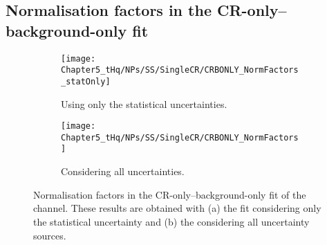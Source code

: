 \begin{comment}
\begin{figure}[h]
  \centering
  \texttt{[image: Chapter5\_tHq/NPs/SS/SingleCR/CRBONLY\_NuisPar\_VVPDF]}
   \caption{Constraints and pulls on the NPs of the diboson PDFs in the CR-only--background-only fit of the \dilepSStau channel.
   Each NP is shown as the relative change from its nominal value.
   The green and yellow areas represent the $\pm1\sigma$ and $\pm2\sigma$ deviations from the nominal value of the NP, respectively. 
   The points represent the best-fit value for the NP and the uncertainty bars represent the post-fit uncertainty.}
  \label{fig:Appendix:AdditionalResults:SS:CRBONLY:CRBONLY_NuisPar_VVPDF}
\end{figure}
\end{comment}


\FloatBarrier
\subsection{Normalisation factors  in the \dilepSStau CR-only--background-only fit}
\label{sec:Appendix:AdditionalResults:SS:CRBONLY:NormFactors}

\begin{figure}[h]
\centering
\begin{subfigure}{.5\textwidth}
  \centering
  \texttt{[image: Chapter5\_tHq/NPs/SS/SingleCR/CRBONLY\_NormFactors\_statOnly]}
  \caption{Using only the statistical uncertainties.}
\end{subfigure}%
\begin{subfigure}{0.5\textwidth}
  \centering
  \texttt{[image: Chapter5\_tHq/NPs/SS/SingleCR/CRBONLY\_NormFactors]}
  \caption{Considering all uncertainties.}
\end{subfigure}
\caption{Normalisation factors in the CR-only--background-only fit of the \dilepSStau channel.
 These results are obtained with (a) the fit considering only the statistical uncertainty and (b) the
considering all uncertainty sources.}
\label{fig:Appendix:AdditionalResults:SS:CRBONLY:NormFactors}
\end{figure}



